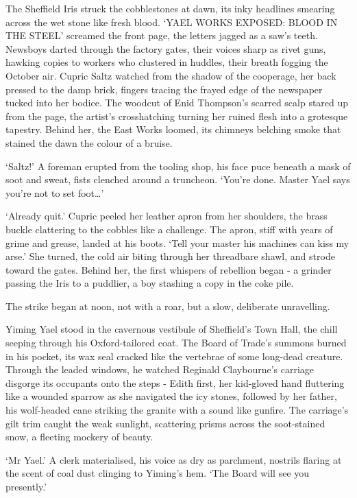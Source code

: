 The Sheffield Iris struck the cobblestones at dawn, its inky headlines smearing across the wet stone like fresh blood. `YAEL WORKS EXPOSED: BLOOD IN THE STEEL' screamed the front page, the letters jagged as a saw's teeth. Newsboys darted through the factory gates, their voices sharp as rivet guns, hawking copies to workers who clustered in huddles, their breath fogging the October air. Cupric Saltz watched from the shadow of the cooperage, her back pressed to the damp brick, fingers tracing the frayed edge of the newspaper tucked into her bodice. The woodcut of Enid Thompson's scarred scalp stared up from the page, the artist's crosshatching turning her ruined flesh into a grotesque tapestry. Behind her, the East Works loomed, its chimneys belching smoke that stained the dawn the colour of a bruise.

`Saltz!' A foreman erupted from the tooling shop, his face puce beneath a mask of soot and sweat, fists clenched around a truncheon. `You're done. Master Yael says you're not to set foot\dots'

`Already quit.' Cupric peeled her leather apron from her shoulders, the brass buckle clattering to the cobbles like a challenge. The apron, stiff with years of grime and grease, landed at his boots. `Tell your master his machines can kiss my arse.' She turned, the cold air biting through her threadbare shawl, and strode toward the gates. Behind her, the first whispers of rebellion began - a grinder passing the Iris to a puddlier, a boy stashing a copy in the coke pile.

The strike began at noon, not with a roar, but a slow, deliberate unravelling.

Yiming Yael stood in the cavernous vestibule of Sheffield's Town Hall, the chill seeping through his Oxford-tailored coat. The Board of Trade's summons burned in his pocket, its wax seal cracked like the vertebrae of some long-dead creature. Through the leaded windows, he watched Reginald Claybourne's carriage disgorge its occupants onto the steps - Edith first, her kid-gloved hand fluttering like a wounded sparrow as she navigated the icy stones, followed by her father, his wolf-headed cane striking the granite with a sound like gunfire. The carriage's gilt trim caught the weak sunlight, scattering prisms across the soot-stained snow, a fleeting mockery of beauty.

`Mr Yael.' A clerk materialised, his voice as dry as parchment, nostrils flaring at the scent of coal dust clinging to Yiming's hem. `The Board will see you presently.'

